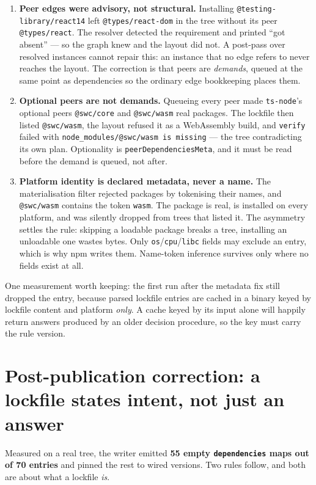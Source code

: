 \documentclass[
  11pt,
  letterpaper,
]{article}
\begin{document}
\begin{enumerate}
\item \textbf{Peer edges were advisory, not structural.} Installing \texttt{@testing-library/react\@14}
left \texttt{@types/react-dom} in the tree without its peer \texttt{@types/react}. The resolver
detected the requirement and printed ``got absent'' --- so the graph knew and the layout did not. A
post-pass over resolved instances cannot repair this: an instance that no edge refers to never
reaches the layout. The correction is that peers are \emph{demands}, queued at the same point as
dependencies so the ordinary edge bookkeeping places them.
\item \textbf{Optional peers are not demands.} Queueing every peer made \texttt{ts-node}'s optional
peers \texttt{@swc/core} and \texttt{@swc/wasm} real packages. The lockfile then listed
\texttt{@swc/wasm}, the layout refused it as a WebAssembly build, and \texttt{verify} failed with
\texttt{node_modules/@swc/wasm is missing} --- the tree contradicting its own plan. Optionality is
\texttt{peerDependenciesMeta}, and it must be read before the demand is queued, not after.
\item \textbf{Platform identity is declared metadata, never a name.} The materialisation filter
rejected packages by tokenising their names, and \texttt{@swc/wasm} contains the token \texttt{wasm}.
The package is real, is installed on every platform, and was silently dropped from trees that listed
it. The asymmetry settles the rule: skipping a loadable package breaks a tree, installing an
unloadable one wastes bytes. Only \texttt{os}/\texttt{cpu}/\texttt{libc} fields may exclude an entry,
which is why npm writes them. Name-token inference survives only where no fields exist at all.
\end{enumerate}

One measurement worth keeping: the first run after the metadata fix still dropped the entry, because
parsed lockfile entries are cached in a binary keyed by lockfile content and platform \emph{only}. A
cache keyed by its input alone will happily return answers produced by an older decision procedure,
so the key must carry the rule version.


\section{Post-publication correction: a lockfile states intent, not just an answer}

Measured on a real tree, the writer emitted \textbf{55 empty \texttt{dependencies} maps out of
70 entries} and pinned the rest to wired versions. Two rules follow, and both are about what a
lockfile \emph{is}.
\end{document}
